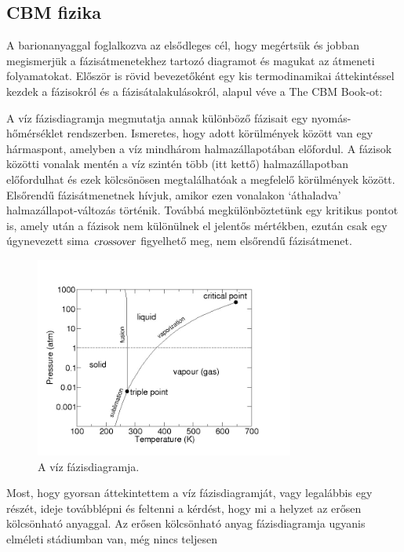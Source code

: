 \documentclass[a4paper,12pt]{article}
\begin{document}
\subsection{ CBM fizika }
\vspace{5mm}
\par A barionanyaggal foglalkozva az elsődleges cél, hogy megértsük és jobban megismerjük a fázisátmenetekhez tartozó diagramot és magukat az átmeneti folyamatokat.
Először is rövid bevezetőként egy kis termodinamikai áttekintéssel kezdek a fázisokról és a fázisátalakulásokról, alapul véve a The CBM Book-ot:
\vspace{5mm}
\par A víz fázisdiagramja megmutatja annak különböző fázisait egy nyomás-hőmérséklet rendszerben. Ismeretes, hogy adott körülmények között van egy
hármaspont, amelyben a víz mindhárom halmazállapotában előfordul. A fázisok közötti vonalak mentén a víz szintén több (itt kettő) halmazállapotban
előfordulhat és ezek kölcsönösen megtalálhatóak a megfelelő körülmények között. Elsőrendű fázisátmenetnek hívjuk, amikor ezen vonalakon `áthaladva' halmazállapot-változás
történik. Továbbá megkülönböztetünk egy kritikus pontot is, amely után a fázisok nem különülnek el jelentős mértékben, ezután
csak egy úgynevezett sima $\textsl{crossover}$ figyelhető meg, nem elsőrendű fázisátmenet.
\begin{figure}[H]
	\centering
	\includegraphics[width=0.76\textwidth]{water_phase.jpg}
	\caption{ A víz fázisdiagramja. }
\end{figure}
\par Most, hogy gyorsan áttekintettem a víz fázisdiagramját, vagy legalábbis egy részét, ideje továbblépni és feltenni a kérdést, hogy mi 
a helyzet az erősen kölcsönható anyaggal. Az erősen kölcsönható anyag fázisdiagramja ugyanis elméleti stádiumban van, még nincs teljesen
\end{document}
